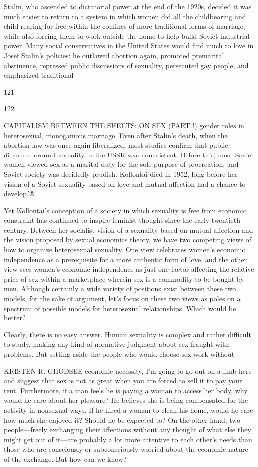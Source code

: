  \par 
Stalin, who ascended to dictatorial power at the end of the 1920s, decided it was much easier to return to a system in which women did all the childbearing and child-rearing for free within the confines of more traditional forms of marriage, while also forcing them to work outside the home to help build Soviet industrial power. Many social conservatives in the United States would find much to love in Josef Stalin’s policies: he outlawed abortion again, promoted premarital abstinence, repressed public discussions of sexuality, persecuted gay people, and emphasized traditional
 \par 
121
 \par 
122
 \par 
CAPITALISM BETWEEN THE SHEETS: ON SEX (PART !) gender roles in heterosexual, monogamous marriage. Even after Stalin’s death, when the abortion law was once again liberalized, most studies confirm that public discourse around sexuality in the USSR was nonexistent. Before this, most Soviet women viewed sex as a marital duty for the sole purpose of procreation, and Soviet society was decidedly prudish. Kollontai died in 1952, long before her vision of a Soviet sexuality based on love and mutual affection had a chance to develop.'®
 \par 
Yet Kollontai’s conception of a society in which sexuality is free from economic constraint has continued to inspire feminist thought since the early twentieth century. Between her socialist vision of a sexuality based on mutual affection and the vision proposed by sexual economics theory, we have two competing views of how to organize heterosexual sexuality. One view celebrates women’s economic independence as a prerequisite for a more authentic form of love, and the other view sees women’s economic independence as just one factor affecting the relative price of sex within a marketplace wherein sex is a commodity to be bought by men. Although certainly a wide variety of positions exist between these two models, for the sake of argument, let’s focus on these two views as poles on a spectrum of possible models for heterosexual relationships. Which would be better?
 \par 
Clearly, there is no easy answer. Human sexuality is complex and rather difficult to study, making any kind of normative judgment about sex fraught with problems. But setting aside the people who would choose sex work without
 \par 
KRISTEN R. GHODSEE economic necessity, I’m going to go out on a limb here and suggest that sex is not as great when you are forced to sell it to pay your rent. Furthermore, if a man feels he is paying a woman to access her body, why would he care about her pleasure? He believes she is being compensated for the activity in nonsexual ways. If he hired a woman to clean his home, would he care how much she enjoyed it? Should he be expected to? On the other hand, two people—freely exchanging their affections without any thought of what else they might get out of it—are probably a lot more attentive to each other’s needs than those who are consciously or subconsciously worried about the economic nature of the exchange. But how can we know?
